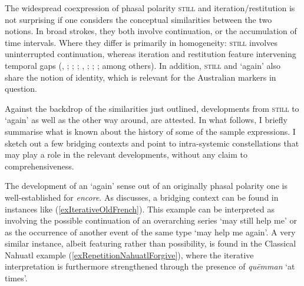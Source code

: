 The widespread coexpression of phasal polarity \textsc{still} and iteration/restitution is not surprising if one considers the conceptual similarities between the two notions. In broad strokes, they both involve continuation, or the accumulation of time intervals. Where they differ is primarily in homogeneity: \textsc{still} involves uninterrupted continuation, whereas iteration and restitution feature intervening temporal gaps (\cite{vanderAuwera1991BeyondDuality}, \citeyear{vanderAuwera1993}; \cite[108–109]{vanBaar1997}; \cite{JingSchmidtGries2009}; \cite{MosegaardHansen2002}, \citeyear[155]{MosegaardHansen2008}; \cite{TovenaDonazzan2008}; \cite[351]{Wilkins1989}; among others). In addition, \textsc{still} and \lq again' also share the notion of identity, which is relevant for the Australian markers in question.

Against the backdrop of the similarities just outlined, developments from \textsc{still} to \lq again\rq{ }as well as the other way around, are attested. In what follows, I briefly summarise what is known about the history of some of the sample expressions. I sketch out a few bridging contexts and point to intra-systemic constellations that may play a role in the relevant developments, without any claim to comprehensiveness.

The development  of an \lq again\rq{ }sense out of an originally phasal polarity one is well-established for  \textit{encore}.  As \textcite[156]{MosegaardHansen2008} discusses, a bridging context can be found in instances like (\ref{exIterativeOldFrench}). This example can be interpreted as involving the possible continuation of an overarching series \lq may still help me' or as the occurrence of another event of the same type \lq may help me again'. A very similar instance, albeit featuring  rather than possibility, is found in the Classical Nahuatl example (\ref{exRepetitionNahuatlForgive}), where the iterative interpretation is furthermore strengthened through the presence of \textit{quēmman} \lq at times\rq{}.

